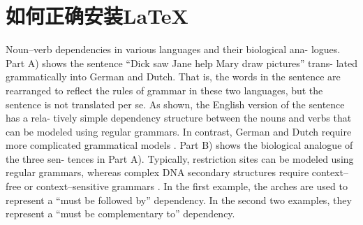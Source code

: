 \chapter{如何正确安装\LaTeX\ }

Noun–verb dependencies in various languages and their biological ana- logues. Part A) shows the sentence “Dick saw Jane help Mary draw pictures” trans- lated grammatically into German and Dutch. That is, the words in the sentence are rearranged to reflect the rules of grammar in these two languages, but the sentence is not translated per se. As shown, the English version of the sentence has a rela- tively simple dependency structure between the nouns and verbs that can be modeled using regular grammars. In contrast, German and Dutch require more complicated grammatical models . Part B) shows the biological analogue of the three sen- tences in Part A). Typically, restriction sites can be modeled using regular grammars, whereas complex DNA secondary structures require context–free or context–sensitive grammars . In the first example, the arches are used to represent a “must be followed by” dependency. In the second two examples, they represent a “must be complementary to” dependency.
